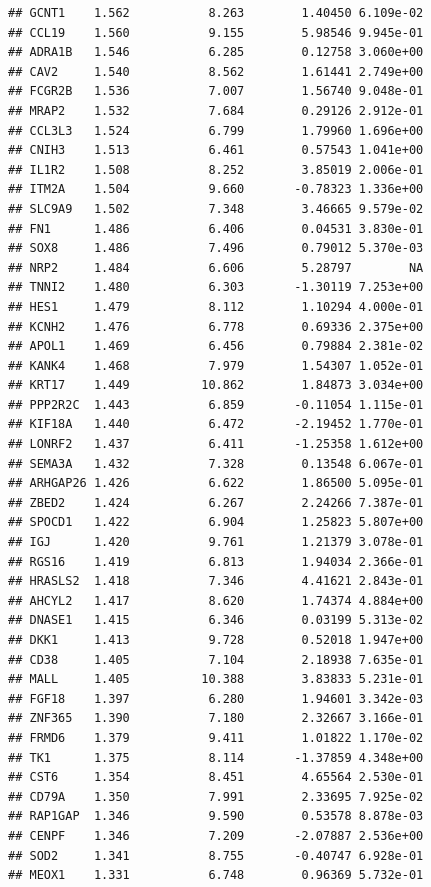 \documentclass{article}\usepackage[]{graphicx}\usepackage[]{color}
\makeatletter
\newenvironment{kframe}{%
 \def\at@end@of@kframe{}%
 \ifinner\ifhmode%
  \def\at@end@of@kframe{\end{minipage}}%
  \begin{minipage}{\columnwidth}%
 \fi\fi%
 \def\FrameCommand##1{\hskip\@totalleftmargin \hskip-\fboxsep
 \colorbox{shadecolor}{##1}\hskip-\fboxsep
     \hskip-\linewidth \hskip-\@totalleftmargin \hskip\columnwidth}%
 \MakeFramed {\advance\hsize-\width
   \@totalleftmargin\z@ \linewidth\hsize
   \@setminipage}}%
 {\par\unskip\endMakeFramed%
 \at@end@of@kframe}
\newenvironment{knitrout}{}{} %
\makeatother
\begin{document}
\begin{knitrout}
\begin{kframe}
\begin{verbatim}
## GCNT1    1.562           8.263        1.40450 6.109e-02
## CCL19    1.560           9.155        5.98546 9.945e-01
## ADRA1B   1.546           6.285        0.12758 3.060e+00
## CAV2     1.540           8.562        1.61441 2.749e+00
## FCGR2B   1.536           7.007        1.56740 9.048e-01
## MRAP2    1.532           7.684        0.29126 2.912e-01
## CCL3L3   1.524           6.799        1.79960 1.696e+00
## CNIH3    1.513           6.461        0.57543 1.041e+00
## IL1R2    1.508           8.252        3.85019 2.006e-01
## ITM2A    1.504           9.660       -0.78323 1.336e+00
## SLC9A9   1.502           7.348        3.46665 9.579e-02
## FN1      1.486           6.406        0.04531 3.830e-01
## SOX8     1.486           7.496        0.79012 5.370e-03
## NRP2     1.484           6.606        5.28797        NA
## TNNI2    1.480           6.303       -1.30119 7.253e+00
## HES1     1.479           8.112        1.10294 4.000e-01
## KCNH2    1.476           6.778        0.69336 2.375e+00
## APOL1    1.469           6.456        0.79884 2.381e-02
## KANK4    1.468           7.979        1.54307 1.052e-01
## KRT17    1.449          10.862        1.84873 3.034e+00
## PPP2R2C  1.443           6.859       -0.11054 1.115e-01
## KIF18A   1.440           6.472       -2.19452 1.770e-01
## LONRF2   1.437           6.411       -1.25358 1.612e+00
## SEMA3A   1.432           7.328        0.13548 6.067e-01
## ARHGAP26 1.426           6.622        1.86500 5.095e-01
## ZBED2    1.424           6.267        2.24266 7.387e-01
## SPOCD1   1.422           6.904        1.25823 5.807e+00
## IGJ      1.420           9.761        1.21379 3.078e-01
## RGS16    1.419           6.813        1.94034 2.366e-01
## HRASLS2  1.418           7.346        4.41621 2.843e-01
## AHCYL2   1.417           8.620        1.74374 4.884e+00
## DNASE1   1.415           6.346        0.03199 5.313e-02
## DKK1     1.413           9.728        0.52018 1.947e+00
## CD38     1.405           7.104        2.18938 7.635e-01
## MALL     1.405          10.388        3.83833 5.231e-01
## FGF18    1.397           6.280        1.94601 3.342e-03
## ZNF365   1.390           7.180        2.32667 3.166e-01
## FRMD6    1.379           9.411        1.01822 1.170e-02
## TK1      1.375           8.114       -1.37859 4.348e+00
## CST6     1.354           8.451        4.65564 2.530e-01
## CD79A    1.350           7.991        2.33695 7.925e-02
## RAP1GAP  1.346           9.590        0.53578 8.878e-03
## CENPF    1.346           7.209       -2.07887 2.536e+00
## SOD2     1.341           8.755       -0.40747 6.928e-01
## MEOX1    1.331           6.748        0.96369 5.732e-01

\end{verbatim}
\end{kframe}
\end{knitrout}
\end{document}
